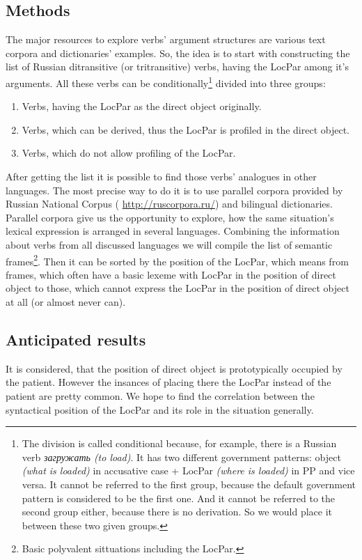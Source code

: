 \subsection{Methods}
The major resources to explore verbs' argument structures are various text corpora and dictionaries' examples. So, the idea is to start with constructing the list of Russian ditransitive (or tritransitive) verbs, having the LocPar among it's arguments. All these verbs can be conditionally\footnote{The division is called conditional because, for example, there is a  Russian verb \textit{загружать (to load)}. It has two different government patterns: object \textit{(what is loaded)} in accusative case + LocPar \textit{(where is loaded)} in PP and vice versa. It cannot be referred to the first group, because the default government pattern is considered to be the first one. And it cannot be referred to the second group either, because there is no derivation. So we would place it between these two given groups.} divided into three groups:
\begin{enumerate}
    \item Verbs, having the LocPar as the direct object originally.
    \item Verbs, which can be derived, thus the LocPar is profiled in the direct object.
    \item Verbs, which do not allow profiling of the LocPar.
\end{enumerate}
After getting the list it is possible to find those verbs' analogues in other languages. The most precise way to do it is to use parallel corpora provided by Russian National Corpus (\small{ \url{http://ruscorpora.ru/}}) \normalsize and bilingual dictionaries. Parallel corpora give us the opportunity to explore, how the same situation's lexical expression is arranged in several languages. Combining the information about verbs from all discussed languages we will compile the list of semantic frames\footnote{Basic polyvalent sittuations including the LocPar.}. Then it can be sorted by the position of the LocPar, which means from frames, which often have a basic lexeme with LocPar in the position of direct object to those, which cannot express the LocPar in the position of direct object at all (or almost never can). 

\subsection{Anticipated results}

It is considered, that the position of direct object is prototypically occupied by the patient. However the insances of placing there the LocPar instead of the patient are pretty common. We hope to find the correlation between the syntactical position of the LocPar and its role in the situation generally. 

